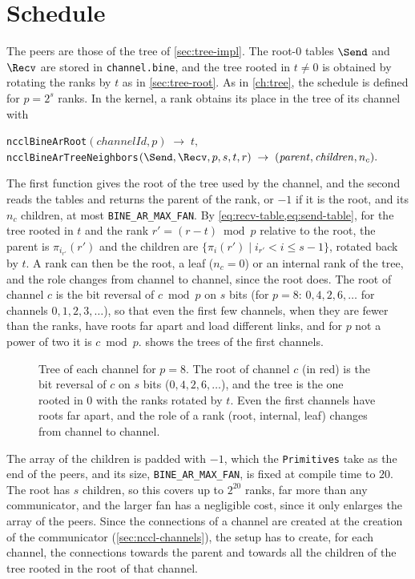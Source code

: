 \section{Schedule}\label{sec:tar-schedule}
The peers are those of the \bine{} tree of \cref{sec:tree-impl}.
The root-$0$ tables $\Send$ and $\Recv$ are stored in \texttt{channel.bine}, and the tree rooted in $t\neq0$ is obtained by rotating the ranks by $t$ as in \cref{sec:tree-root}.
As in \cref{ch:tree}, the schedule is defined for $p=2^s$ ranks.
In the kernel, a rank obtains its place in the tree of its channel with
\begin{center}\small
\texttt{ncclBineArRoot}$(\mathit{channelId},p)\;\rightarrow\;t,$\\
\texttt{ncclBineArTreeNeighbors}$(\Send,\Recv,p,s,t,r)\;\rightarrow\;(\mathit{parent},\mathit{children},n_c).$
\end{center}
The first function gives the root of the tree used by the channel, and the second reads the tables and returns the parent of the rank, or $-1$ if it is the root, and its $n_c$ children, at most \texttt{BINE\_AR\_MAX\_FAN}.
By \cref{eq:recv-table,eq:send-table}, for the tree rooted in $t$ and the rank $r'=(r-t)\bmod p$ relative to the root, the parent is $\pi_{i_{r'}}(r')$ and the children are $\{\pi_i(r')\mid i_{r'}<i\le s-1\}$, rotated back by $t$.
A rank can then be the root, a leaf ($n_c=0$) or an internal rank of the tree, and the role changes from channel to channel, since the root does.
The root of channel $c$ is the bit reversal of $c \bmod p$ on $s$ bits (for $p=8$: $0,4,2,6,\dots$ for channels $0,1,2,3,\dots$), so that even the first few channels, when they are fewer than the ranks, have roots far apart and load different links, and for $p$ not a power of two it is $c\bmod p$.
 shows the trees of the first channels.
\begin{figure}[t]
  \centering
  \hfill
  \hfill
  \caption{Tree of each channel for $p=8$. The root of channel $c$ (in red) is the bit
           reversal of $c$ on $s$ bits ($0,4,2,6,\dots$), and the tree is the one rooted
           in $0$ with the ranks rotated by $t$. Even the first channels have roots far
           apart, and the role of a rank (root, internal, leaf) changes from channel to
           channel.}
  \label{fig:tar-roots}
\end{figure}
The array of the children is padded with $-1$, which the \texttt{Primitives} take as the end of the peers, and its size, \texttt{BINE\_AR\_MAX\_FAN}, is fixed at compile time to $20$.
The root has $s$ children, so this covers up to $2^{20}$ ranks, far more than any communicator, and the larger fan has a negligible cost, since it only enlarges the array of the peers.
Since the connections of a channel are created at the creation of the communicator (\cref{sec:nccl-channels}), the setup has to create, for each channel, the connections towards the parent and towards all the children of the tree rooted in the root of that channel.
